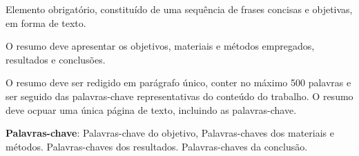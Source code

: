
\noindent%
Elemento obrigatório, constituído de uma sequência de frases concisas e objetivas, em forma de texto.

\noindent 
O resumo deve apresentar os objetivos, materiais e métodos empregados, resultados e conclusões. 

\noindent 
O resumo deve ser redigido em parágrafo único, conter no máximo 500 palavras e ser seguido das palavras-chave  representativas do conteúdo do trabalho. O resumo deve ocpuar uma única página de texto, incluindo as palavras-chave.
\vfill

\noindent 
\textbf{Palavras-chave}: Palavras-chave do objetivo, Palavras-chaves dos materiais e métodos. Palavras-chaves dos resultados. Palavras-chaves da conclusão.
